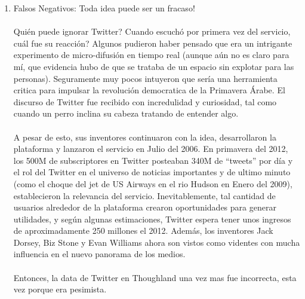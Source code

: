 \documentclass{article}
\begin{document}
\begin{enumerate}
\begin{itemize}
  \item La pel\'icula de Disney ``John Carter'' (Costo: \$275M + \$100M en marketing)
  \item Sistema telef\'onico satelital Motorola Iridium (\$6B por 66 Satelites)
  \item Transportador Segway (~\$180M en financiamiento)
  \item Pontiac Aztek (\$200M+)
  \item Google Wave (~\$20M-\$30M)
  \item Nueva Coca-Cola o Pepsi (estimado \$50M cada una)
\end{itemize}

  \item Falsos Negativos: Toda idea puede ser un fracaso!
  \\ \\
Qui\'en puede ignorar Twitter? Cuando escuch\'o por primera vez del servicio, cu\'al fue su reacci\'on? Algunos pudieron haber pensado que era un intrigante experimento de micro-difusi\'on en tiempo real (aunque a\'un no es claro para m\'i, que evidencia hubo de que se trataba de un espacio sin explotar para las personas). Seguramente muy pocos intuyeron que ser\'ia una herramienta critica para impulsar la revoluci\'on democratica de la Primavera \'Arabe. El discurso de Twitter fue recibido con incredulidad y curiosidad, tal como cuando un perro inclina su cabeza tratando de entender algo.
\\ \\
A pesar de esto, sus inventores continuaron con la idea, desarrollaron la plataforma y lanzaron el servicio en Julio del 2006.    En primavera del 2012, los 500M de subscriptores en Twitter posteaban 340M de ``tweets'' por d\'ia y el rol del Twitter en el universo de noticias importantes y de ultimo minuto (como el choque del jet de US Airways en el rio Hudson en Enero del 2009), establecieron la relevancia del servicio.
Inevitablemente, tal cantidad de usuarios alrededor de la plataforma crearon oportunidades para generar utilidades, y seg\'un algunas estimaciones, Twitter espera tener unos ingresos de aproximadamente 250 millones el 2012.   Adem\'as, los inventores Jack Dorsey, Biz Stone y Evan Williams ahora son vistos como videntes con mucha influencia en el nuevo panorama de los medios.
\\ \\
Entonces, la data de Twitter en Thoughland una vez mas fue incorrecta, esta vez porque era pesimista.
\end{enumerate}
\end{document}
